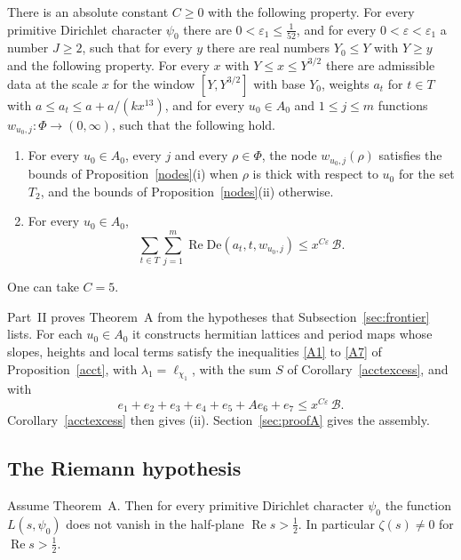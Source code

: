 \begin{theoremA}
There is an absolute constant $C\ge0$ with the following property. For every primitive Dirichlet character $\psi_0$ there are $0<\varepsilon_1\le\frac1{52}$, and for every $0<\varepsilon<\varepsilon_1$ a number $J\ge2$, such that for every $y$ there are real numbers $Y_0\le Y$ with $Y\ge y$ and the following property. For every $x$ with $Y\le x\le Y^{3/2}$ there are admissible data at the scale $x$ for the window $[Y,Y^{3/2}]$ with base $Y_0$, weights $a_t$ for $t\in T$ with $a\le a_t\le a+a/(kx^{13})$, and for every $u_0\in A_0$ and $1\le j\le m$ functions $w_{u_0,j}\colon\Phi\to(0,\infty)$, such that the following hold.
\begin{enumerate}
\item[(i)] For every $u_0\in A_0$, every $j$ and every $\rho\in\Phi$, the node $w_{u_0,j}(\rho)$ satisfies the bounds of Proposition~\ref{nodes}(i) when $\rho$ is thick with respect to $u_0$ for the set $T_2$, and the bounds of Proposition~\ref{nodes}(ii) otherwise.
\item[(ii)] For every $u_0\in A_0$,
\[
\sum_{t\in T}\sum_{j=1}^m\operatorname{Re}\mathrm{De}(a_t,t,w_{u_0,j})\le x^{C\varepsilon}\,\mathcal B .
\]
\end{enumerate}
One can take $C=5$.
\end{theoremA}

Part~II proves Theorem~A from the hypotheses that Subsection~\ref{sec:frontier} lists. For each $u_0\in A_0$ it constructs hermitian lattices and period maps whose slopes, heights and local terms satisfy the inequalities \eqref{A1} to \eqref{A7} of Proposition~\ref{acct}, with $\lambda_1=\ell_{\chi_1}$, with the sum $S$ of Corollary~\ref{acctexcess}, and with
\[
e_1+e_2+e_3+e_4+e_5+Ae_6+e_7\le x^{C\varepsilon}\,\mathcal B .
\]
Corollary~\ref{acctexcess} then gives (ii). Section~\ref{sec:proofA} gives the assembly.

\subsection{The Riemann hypothesis}

\begin{theorem}\label{mainthm}
Assume Theorem~A. Then for every primitive Dirichlet character $\psi_0$ the function $L(s,\psi_0)$ does not vanish in the half-plane $\operatorname{Re}s>\frac12$. In particular $\zeta(s)\ne0$ for $\operatorname{Re}s>\frac12$.
\end{theorem}

